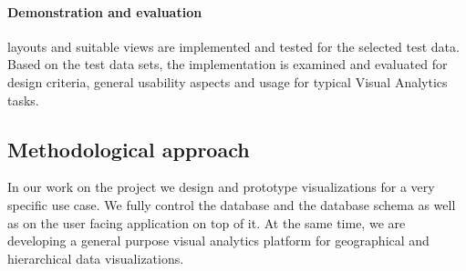 \documentclass{article}
\begin{document}
\paragraph{Demonstration and evaluation}
\cmv{} layouts and suitable views are implemented and tested for the selected test data.
Based on the test data sets, the \cmv{} implementation is examined and evaluated for design criteria\cite{Baldonado2000}, general usability aspects\cite{Roberts2007} and usage for typical Visual Analytics tasks.




\subsection{Methodological approach}

In our work on the project \rufu{} we design and prototype visualizations for a very specific use case.
We fully control the database and the database schema as well as on the user facing application on top of it.
At the same time, we are developing a general purpose visual analytics platform for geographical and hierarchical data visualizations.
\end{document}
